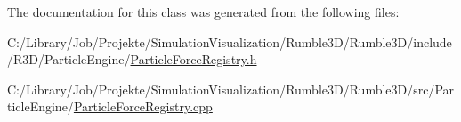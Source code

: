 The documentation for this class was generated from the following files\+:\begin{DoxyCompactItemize}
\item 
C\+:/\+Library/\+Job/\+Projekte/\+Simulation\+Visualization/\+Rumble3\+D/\+Rumble3\+D/include/\+R3\+D/\+Particle\+Engine/\mbox{\hyperlink{_particle_force_registry_8h}{Particle\+Force\+Registry.\+h}}\item 
C\+:/\+Library/\+Job/\+Projekte/\+Simulation\+Visualization/\+Rumble3\+D/\+Rumble3\+D/src/\+Particle\+Engine/\mbox{\hyperlink{_particle_force_registry_8cpp}{Particle\+Force\+Registry.\+cpp}}\end{DoxyCompactItemize}
